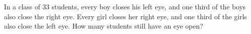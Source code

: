 In a class of $33$ students, every boy closes his left eye, and one third of the boys also close the right eye. Every girl closes her right eye, and one third of the girls also close the left eye. How many students still have an eye open?
